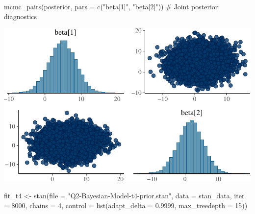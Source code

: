 \documentclass[
  10pt,
]{article}
\newenvironment{Shaded}{\begin{snugshade}}{\end{snugshade}}
\newcommand{\AttributeTok}[1]{\textcolor[rgb]{0.40,0.45,0.13}{#1}}
\newcommand{\CommentTok}[1]{\textcolor[rgb]{0.37,0.37,0.37}{#1}}
\newcommand{\DecValTok}[1]{\textcolor[rgb]{0.68,0.00,0.00}{#1}}
\newcommand{\FloatTok}[1]{\textcolor[rgb]{0.68,0.00,0.00}{#1}}
\newcommand{\FunctionTok}[1]{\textcolor[rgb]{0.28,0.35,0.67}{#1}}
\newcommand{\NormalTok}[1]{\textcolor[rgb]{0.00,0.23,0.31}{#1}}
\newcommand{\OtherTok}[1]{\textcolor[rgb]{0.00,0.23,0.31}{#1}}
\newcommand{\StringTok}[1]{\textcolor[rgb]{0.13,0.47,0.30}{#1}}
\begin{document}
\begin{Shaded}
\begin{Highlighting}[]
\FunctionTok{mcmc\_pairs}\NormalTok{(posterior, }\AttributeTok{pars =} \FunctionTok{c}\NormalTok{(}\StringTok{"beta[1]"}\NormalTok{, }\StringTok{"beta[2]"}\NormalTok{)) }\CommentTok{\# Joint posterior diagnostics}
\end{Highlighting}
\end{Shaded}

\includegraphics{551-HW-Q2_files/figure-pdf/unnamed-chunk-4-3.pdf}

\begin{Shaded}
\begin{Highlighting}[]
\NormalTok{fit\_t4 }\OtherTok{\textless{}{-}} \FunctionTok{stan}\NormalTok{(}\AttributeTok{file =} \StringTok{"Q2{-}Bayesian{-}Model{-}t4{-}prior.stan"}\NormalTok{, }
               \AttributeTok{data =}\NormalTok{ stan\_data, }
               \AttributeTok{iter =} \DecValTok{8000}\NormalTok{, }
               \AttributeTok{chains =} \DecValTok{4}\NormalTok{, }
               \AttributeTok{control =} \FunctionTok{list}\NormalTok{(}\AttributeTok{adapt\_delta =} \FloatTok{0.9999}\NormalTok{, }\AttributeTok{max\_treedepth =} \DecValTok{15}\NormalTok{))}
\end{Highlighting}
\end{Shaded}
\end{document}
